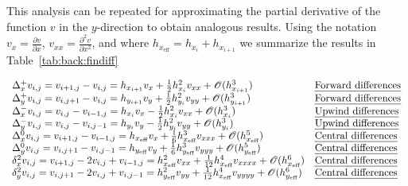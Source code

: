 This analysis can be repeated for approximating the partial derivative of the
function $v$ in the $y$-direction to obtain analogous results. Using the notation $v_{x}=\frac{\partial v}{\partial x}$, $v_{xx}=\frac{\partial^2 v}{\partial x^2}$, and where $h_{x_{\text{eff}}}=h_{x_i}+h_{x_{i+1}}$ we
summarize the results in Table~\ref{tab:back:findiff}

\begin{equation}\label{tab:back:findiff}
\begin{array}{ll}
\Delta^{+}_{x} v_{i,j} = v_{i+1,j} - v_{i,j} = h_{x_{i+1}} v_{x} + \frac{1}{2}h_{x_{i}}^2 v_{xx} + \mathscr{O}(h_{x_{i+1}}^3) &
\text{\emph{Forward differences}} \\
\Delta^{+}_{y} v_{i,j} = v_{i,j+1} - v_{i,j} = h_{y_{i+1}} v_{y} + \frac{1}{2}h_{y_{i}}^2 v_{yy} + \mathscr{O}(h_{y_{i+1}}^3) &
\text{\emph{Forward differences}}\\
\Delta^{-}_{x} v_{i,j} = v_{i,j} - v_{i-1,j} = h_{x_{i}} v_{x} - \frac{1}{2}h_{x_{i}}^2 v_{xx} + \mathscr{O}(h_{x_{i}}^3) &
\text{\emph{Upwind differences}} \\
\Delta^{-}_{y} v_{i,j} = v_{i,j} - v_{i,j-1} = h_{y_{i}} v_{y} - \frac{1}{2}h_{y_{i}}^2 v_{yy} + \mathscr{O}(h_{y_{i}}^3) &
\text{\emph{Upwind differences}}\\
\Delta^{0}_{x} v_{i,j} = v_{i+1,j} - v_{i-1,j} = h_{x_{\text{eff}}} v_{x} +
\frac{1}{6}h_{x_{\text{eff}}}^3 v_{xxx} + \mathscr{O}(h_{x_{\text{eff}}}^5) &
\text{\emph{Central differences}} \\
\Delta^{0}_{y} v_{i,j} = v_{i,j+1} - v_{i,j-1} = h_{y_{\text{eff}}} v_{y} + \frac{1}{6}h_{y_{\text{eff}}}^3 v_{yyy} + \mathscr{O}(h_{y_{\text{eff}}}^5) &
\text{\emph{Central differences}} \\
\delta^{2}_{x} v_{i,j} = v_{i+1,j} - 2v_{i,j}+v_{i-1,j} = h_{x_{\text{eff}}}^2 v_{xx} + \frac{1}{12}h_{x_{\text{eff}}}^4 v_{xxxx} + \mathscr{O}(h_{x_{\text{eff}}}^6) &
\text{\emph{Central differences}} \\
\delta^{2}_{y} v_{i,j} = v_{i,j+1} - 2v_{i,j} + v_{i,j-1} = h_{y_{\text{eff}}}^2 v_{yy} + \frac{1}{12}h_{x_{\text{eff}}}^4 v_{yyyy} + \mathscr{O}(h_{y_{\text{eff}}}^6) &
\text{\emph{Central differences}}
\end{array}
\end{equation}

